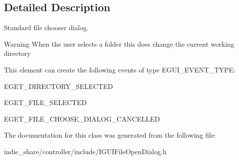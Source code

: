 \subsection{Detailed Description}
Standard file chooser dialog. 

\begin{DoxyWarning}{Warning}
When the user selects a folder this does change the current working directory
\end{DoxyWarning}
\begin{DoxyParagraph}{This element can create the following events of type E\+G\+U\+I\+\_\+\+E\+V\+E\+N\+T\+\_\+\+T\+Y\+PE\+:}
\begin{DoxyItemize}
\item E\+G\+E\+T\+\_\+\+D\+I\+R\+E\+C\+T\+O\+R\+Y\+\_\+\+S\+E\+L\+E\+C\+T\+ED \item E\+G\+E\+T\+\_\+\+F\+I\+L\+E\+\_\+\+S\+E\+L\+E\+C\+T\+ED \item E\+G\+E\+T\+\_\+\+F\+I\+L\+E\+\_\+\+C\+H\+O\+O\+S\+E\+\_\+\+D\+I\+A\+L\+O\+G\+\_\+\+C\+A\+N\+C\+E\+L\+L\+ED \end{DoxyItemize}

\end{DoxyParagraph}


The documentation for this class was generated from the following file\+:\begin{DoxyCompactItemize}
\item 
indie\+\_\+share/controller/include/I\+G\+U\+I\+File\+Open\+Dialog.\+h\end{DoxyCompactItemize}
